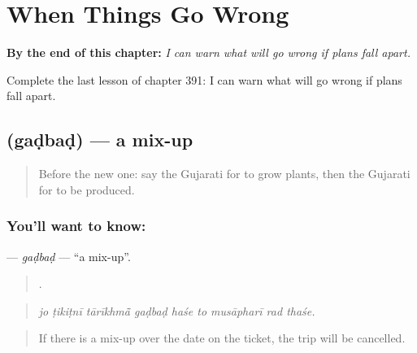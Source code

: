 
\chapter{When Things Go Wrong}
\label{ch:gu-when-things-go-wrong}

\begin{chapteropening}
\textbf{By the end of this chapter:} \emph{I can warn what will go wrong if plans fall apart.}

Complete the last lesson of chapter 391: I can warn what will go wrong if plans fall apart.
\end{chapteropening}

\section[\texorpdfstring{\gu{ગડબડ} (gaḍbaḍ)}{ગડબડ (gaḍbaḍ)}]{ (gaḍbaḍ) — a mix-up}

\label{lesson:GU-C391-gadbad}



\begin{quote}
Before the new one: say the Gujarati for to grow plants, then the Gujarati for to be produced.
\end{quote}

\subsection*{You'll want to know: }
\textbf{} — \emph{gaḍbaḍ} — \textquotedblleft{}a mix-up\textquotedblright{}.

\begin{quote}
        .
\end{quote}

\begin{quote}
\emph{jo ṭikiṭnī tārīkhmā̃ gaḍbaḍ haśe to musāpharī rad thaśe.}
\end{quote}

\begin{quote}
If there is a mix-up over the date on the ticket, the trip will be cancelled.
\end{quote}

